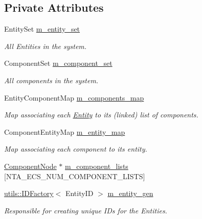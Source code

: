 \subsection*{Private Attributes}
\begin{DoxyCompactItemize}
\item 
\mbox{\label{classnta_1_1ECS_abd914b89f79ea39e02d410e9d709a845}} 
Entity\+Set \hyperlink{classnta_1_1ECS_abd914b89f79ea39e02d410e9d709a845}{m\+\_\+entity\+\_\+set}
\begin{DoxyCompactList}\small\item\em All Entities in the system. \end{DoxyCompactList}\item 
\mbox{\label{classnta_1_1ECS_a977c7be937b70dd273153b67a1faf9a5}} 
Component\+Set \hyperlink{classnta_1_1ECS_a977c7be937b70dd273153b67a1faf9a5}{m\+\_\+component\+\_\+set}
\begin{DoxyCompactList}\small\item\em All components in the system. \end{DoxyCompactList}\item 
\mbox{\label{classnta_1_1ECS_aa7069093670285de8ae96f5a8f6e7272}} 
Entity\+Component\+Map \hyperlink{classnta_1_1ECS_aa7069093670285de8ae96f5a8f6e7272}{m\+\_\+components\+\_\+map}
\begin{DoxyCompactList}\small\item\em Map associating each \hyperlink{classnta_1_1Entity}{Entity} to its (linked) list of components. \end{DoxyCompactList}\item 
\mbox{\label{classnta_1_1ECS_ab5c3a72aaaa0d6afef6f7bd7a0ee9c02}} 
Component\+Entity\+Map \hyperlink{classnta_1_1ECS_ab5c3a72aaaa0d6afef6f7bd7a0ee9c02}{m\+\_\+entity\+\_\+map}
\begin{DoxyCompactList}\small\item\em Map associating each component to its entity. \end{DoxyCompactList}\item 
\hyperlink{structnta_1_1utils_1_1LinkedNode}{Component\+Node} $\ast$ \hyperlink{classnta_1_1ECS_a2d45b9e54bcc636faac7cbb403b478bd}{m\+\_\+component\+\_\+lists} \mbox{[}N\+T\+A\+\_\+\+E\+C\+S\+\_\+\+N\+U\+M\+\_\+\+C\+O\+M\+P\+O\+N\+E\+N\+T\+\_\+\+L\+I\+S\+TS\mbox{]}
\item 
\mbox{\label{classnta_1_1ECS_a8c2683281c1f6bfdc2765cca5059c8af}} 
\hyperlink{classnta_1_1utils_1_1IDFactory}{utils\+::\+I\+D\+Factory}$<$ Entity\+ID $>$ \hyperlink{classnta_1_1ECS_a8c2683281c1f6bfdc2765cca5059c8af}{m\+\_\+entity\+\_\+gen}
\begin{DoxyCompactList}\small\item\em Responsible for creating unique I\+Ds for the Entities. \end{DoxyCompactList}\end{DoxyCompactItemize}


